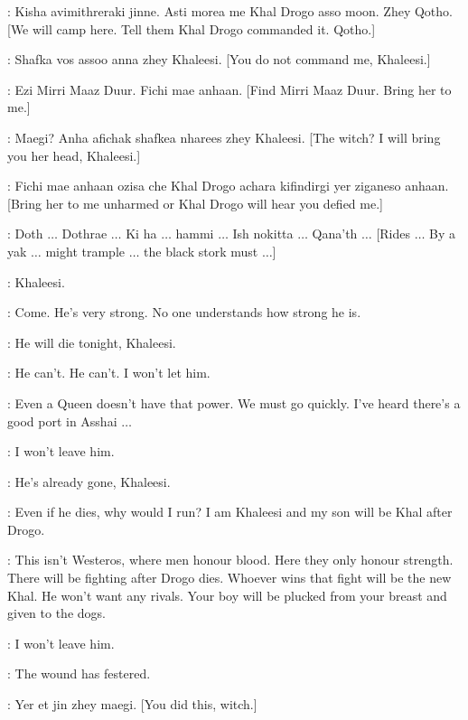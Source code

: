 \DAENERYS: Kisha avimithreraki jinne. Asti morea me Khal Drogo asso moon. Zhey Qotho. [We will camp here. Tell them Khal Drogo commanded it. Qotho.] 

\QOTHO: Shafka vos assoo anna zhey Khaleesi. [You do not command me, Khaleesi.] 

\DAENERYS: Ezi Mirri Maaz Duur. Fichi mae anhaan. [Find Mirri Maaz Duur. Bring her to me.] 

\QOTHO: Maegi? Anha afichak shafkea nharees zhey Khaleesi. [The witch? I will bring you her head, Khaleesi.] 

\DAENERYS: Fichi mae anhaan ozisa che Khal Drogo achara kifindirgi yer ziganeso anhaan. [Bring her to me unharmed or Khal Drogo will hear you defied me.] 


\DROGO: Doth $\ldots$ Dothrae $\ldots$ Ki ha $\ldots$ hammi $\ldots$ Ish nokitta $\ldots$ Qana'th $\ldots$ [Rides $\ldots$ By a yak $\ldots$ might trample $\ldots$ the black stork must $\ldots$] 

\JORAH: Khaleesi.  

\DAENERYS: Come.  He's very strong. No one understands how strong he is. 

\JORAH: He will die tonight, Khaleesi. 

\DAENERYS: He can't. He can't. I won't let him. 

\JORAH: Even a Queen doesn't have that power. We must go quickly. I've heard there's a good port in Asshai $\ldots$  

\DAENERYS: I won't leave him. 

\JORAH: He's already gone, Khaleesi. 

\DAENERYS: Even if he dies, why would I run? I am Khaleesi and my son will be Khal after Drogo. 

\JORAH: This isn't Westeros, where men honour blood. Here they only honour strength. There will be fighting after Drogo dies. Whoever wins that fight will be the new Khal. He won't want any rivals. Your boy will be plucked from your breast and given to the dogs. 

\DAENERYS: I won't leave him. 


\MIRRI: The wound has festered. 

\QOTHO: Yer et jin zhey maegi. [You did this, witch.] 

